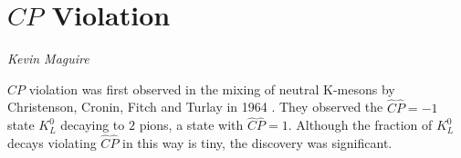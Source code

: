 \section{$CP$ Violation}
\vspace{-1.0em}
\begin{center}
\tiny{\textit{Kevin Maguire}}
\end{center}

$CP$ violation was first observed in the mixing of neutral K-mesons by Christenson, Cronin, Fitch and Turlay in 1964 \cite{FirstCPV}. They observed the $\hat{C}\hat{P} = -1$ state $K^{0}_L$ decaying to $2$ pions, a state with $\hat{C}\hat{P} = 1$. Although the fraction of $K^{0}_L$ decays violating $\hat{C}\hat{P}$ in this way is tiny, the discovery was significant.     
